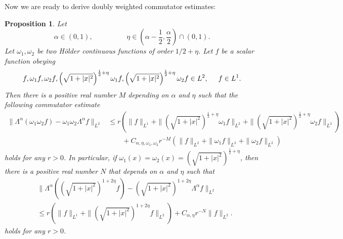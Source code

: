 \documentclass[12pt,reqno]{amsart}
\newcommand{\be}{\begin{equation}}
\newcommand{\ee}{\end{equation}}
\newtheorem{prop}[thm]{Proposition}
\begin{document}
Now we are ready to derive doubly weighted commutator estimates:

\begin{prop} \label{double} Let 
\be 
\alpha \in (0,1), \hspace{2cm} \eta \in \left(\alpha - \frac{1}{2}, \frac{\alpha}{2} \right) \cap (0,1).
\ee 
Let $\omega_1, \omega_2$ be two H\"older continuous functions of order $1/2 +\eta$. Let $f$ be a  scalar function obeying
\be 
f, \omega_1 f, \omega_2f, \left(\sqrt{1+|x|^2}\right)^{\frac{1}{2}+\eta}  \omega_1 f, \left(\sqrt{1+|x|^2}\right)^{\frac{1}{2}+\eta} \omega_2 f \in L^2, \hspace{0.5cm} f \in L^1. 
\ee  Then there is a positive real number $M$ depending on $\alpha$ and $\eta$ such that the following commutator estimate
\be \label{prop14}
\begin{aligned}
\|\Lambda^{\alpha}( \omega_1 \omega_2 f) - \omega_1 \omega_2 \Lambda^{\alpha}f\|_{L^2} 
&\le
r \left(\|f\|_{L^1} + \|\left(\sqrt{1+|x|^2}\right)^{\frac{1}{2}+\eta} \omega_1 f\|_{L^2} + \|\left(\sqrt{1+|x|^2}\right)^{\frac{1}{2}+\eta} \omega_2 f\|_{L^2}\right)
\\&\quad\quad+ C_{\alpha,  \eta, \omega_1, \omega_2} r^{-M} \left(\|f\|_{L^2} + \|\omega_1 f\|_{L^2} + \|\omega_2 f\|_{L^2}\right)
\end{aligned}
\ee holds for any $r > 0$. 
In particular, if $\omega_1(x) = \omega_2(x) = (\sqrt{1+|x|^2})^{\frac{1}{2}+\eta}$, then there is a positive real number $N$ that depends on $\alpha$ and $\eta$ such that 
\be \label{corre}
\begin{aligned}
&\|\Lambda^{\alpha}\left( \left(\sqrt{1+|x|^2}\right)^{1+2\eta} f\right) - \left(\sqrt{1+|x|^2}\right)^{1+2\eta}\Lambda^{\alpha} f\|_{L^2}
\\&\le
r \left(\|f\|_{L^1} + \|\left(\sqrt{1+|x|^2}\right)^{1+2\eta} f\|_{L^2} \right)
+ C_{\alpha,  \eta} r^{-N} \|f \|_{L^2}.
\end{aligned}
\ee holds for any $r > 0$. 
\end{prop}
\end{document}
